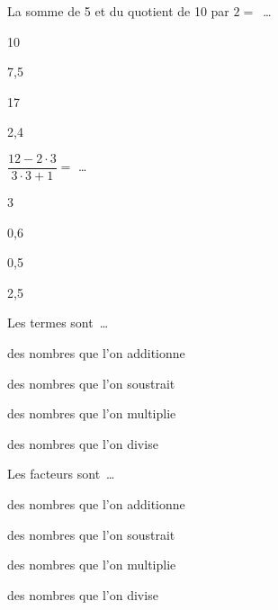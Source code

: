 \begin{QCM}
\begin{GroupeQCM}
\begin{exercice}
      La somme de 5 et du quotient de 10 par $2 =$ \ldots
      \begin{ChoixQCM}{4}
      \item 10
      \item 7,5
      \item 17
      \item 2,4
      \end{ChoixQCM}
\begin{corrige}
   \end{corrige}
    \end{exercice}
    
\begin{exercice}
      $\dfrac{12 - 2 \cdot 3}{3 \cdot 3 + 1} =$ \ldots
      \begin{ChoixQCM}{4}
      \item 3
      \item 0,6
      \item 0,5
      \item 2,5
      \end{ChoixQCM}
\begin{corrige}
   \end{corrige}
    \end{exercice}
    
\begin{exercice}
      Les termes sont \ldots
      \begin{ChoixQCM}{4}
      \item des nombres que l'on additionne
      \item des nombres que l'on soustrait
      \item des nombres que l'on multiplie
      \item des nombres que l'on divise
      \end{ChoixQCM}
\begin{corrige}
   \end{corrige}
    \end{exercice}
    
\begin{exercice}
      Les facteurs sont \ldots
      \begin{ChoixQCM}{4}
      \item des nombres que l'on additionne
      \item des nombres que l'on soustrait
      \item des nombres que l'on multiplie
      \item des nombres que l'on divise
      \end{ChoixQCM}
\begin{corrige}
   \end{corrige}
    \end{exercice}
    

\end{GroupeQCM}
\end{QCM}
